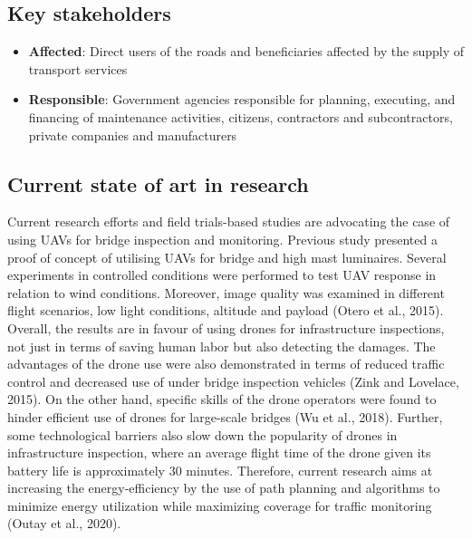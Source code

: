 \documentclass[
]{book}
\providecommand{\tightlist}{%
  \setlength{\itemsep}{0pt}\setlength{\parskip}{0pt}}
\begin{document}
\hypertarget{key-stakeholders-4}{%
\subsection*{Key stakeholders}\label{key-stakeholders-4}}

\begin{itemize}
\tightlist
\item
  \textbf{Affected}: Direct users of the roads and beneficiaries affected by the supply of transport services
\item
  \textbf{Responsible}: Government agencies responsible for planning, executing, and financing of maintenance activities, citizens, contractors and subcontractors, private companies and manufacturers
\end{itemize}

\hypertarget{current-state-of-art-in-research-4}{%
\subsection*{Current state of art in research}\label{current-state-of-art-in-research-4}}

Current research efforts and field trials-based studies are advocating the case of using UAVs for bridge inspection and monitoring. Previous study presented a proof of concept of utilising UAVs for bridge and high mast luminaires. Several experiments in controlled conditions were performed to test UAV response in relation to wind conditions. Moreover, image quality was examined in different flight scenarios, low light conditions, altitude and payload (Otero et al., 2015). Overall, the results are in favour of using drones for infrastructure inspections, not just in terms of saving human labor but also detecting the damages. The advantages of the drone use were also demonstrated in terms of reduced traffic control and decreased use of under bridge inspection vehicles (Zink and Lovelace, 2015). On the other hand, specific skills of the drone operators were found to hinder efficient use of drones for large-scale bridges (Wu et al., 2018). Further, some technological barriers also slow down the popularity of drones in infrastructure inspection, where an average flight time of the drone given its battery life is approximately 30 minutes. Therefore, current research aims at increasing the energy-efficiency by the use of path planning and algorithms to minimize energy utilization while maximizing coverage for traffic monitoring (Outay et al., 2020).
\end{document}
